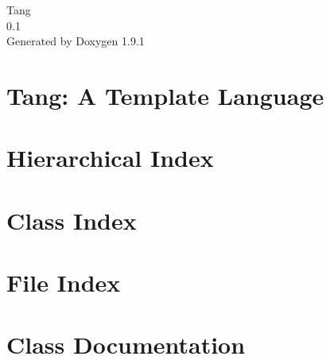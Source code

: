 \let\mypdfximage\pdfximage\def\pdfximage{\immediate\mypdfximage}\documentclass[twoside]{book}
\newcommand{\+}{\discretionary{\mbox{\scriptsize$\hookleftarrow$}}{}{}}
\newcommand{\clearemptydoublepage}{%
  \newpage{\pagestyle{empty}\cleardoublepage}%
}
\begin{document}
\raggedbottom

\hypersetup{pageanchor=false,
             bookmarksnumbered=true,
             pdfencoding=unicode
            }
\begin{titlepage}
\vspace*{7cm}
\begin{center}%
{\Large Tang \\[1ex]\large 0.\+1 }\\
\vspace*{1cm}
{\large Generated by Doxygen 1.9.1}\\
\end{center}
\end{titlepage}
\clearemptydoublepage
{}
\tableofcontents
\clearemptydoublepage
{}
\hypersetup{pageanchor=true}

\chapter{Tang\+: A Template Language}
\label{index}\hypertarget{index}{}
\chapter{Hierarchical Index}

\chapter{Class Index}

\chapter{File Index}

\chapter{Class Documentation}























\end{document}
